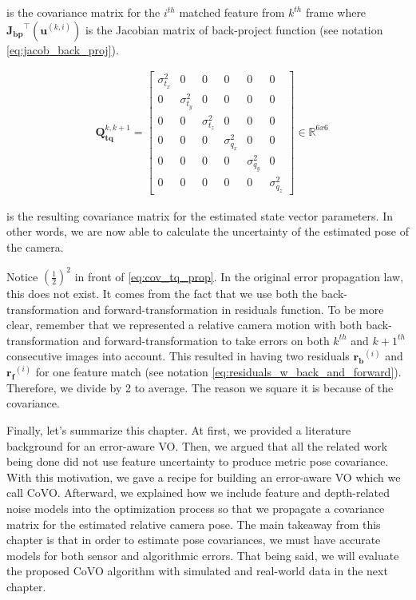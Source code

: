 \documentclass[12pt]{report}
\numberwithin{figure}{section}
\newcommand{\R}{\mathbb{R}}
\begin{document}
is the covariance matrix for the $i^{th}$ matched feature from $k^{th}$ frame 
where $\mathbf{J_{bp}}^\top(\mathbf{u}^{(k,i)})$ is the Jacobian matrix 
of 
back-project function (see notation \eqref{eq:jacob_back_proj}).

\begin{equation} \begin{aligned} & \mathbf{Q}_{\mathbf{tq}}^{k,k+1}  =
\begin{bmatrix} \sigma_{t_x}^2 & 0 & 0 & 0 & 0 & 0 \\ 0 & \sigma_{t_y}^2 & 0 &
0 & 0 & 0 \\ 0 & 0 & \sigma_{t_z}^2 & 0 & 0 & 0 \\ 0 & 0 & 0 & \sigma_{q_x}^2 &
0 & 0 \\ 0 & 0 & 0 & 0 & \sigma_{q_y}^2 & 0 \\ 0 & 0 & 0 & 0 & 0 &
\sigma_{q_z}^2 \end{bmatrix} \in \R^{6x6} \end{aligned} \end{equation}

is the resulting covariance matrix for the estimated state vector parameters.
In other words, we are now able to calculate the uncertainty of the estimated
pose of the camera.

Notice $(\frac{1}{2})^2$ in front of \eqref{eq:cov_tq_prop}.  In the original
error propagation law, this does not exist.  It comes from the fact that we use
both the back-transformation and forward-transformation in residuals 
function.  To be
more clear, remember that we represented a relative camera motion with both
back-transformation and forward-transformation to take errors on both $k^{th}$ 
and $k+1^{th}$
consecutive images into account. This resulted in having two residuals
$\mathbf{r_b}^{(i)}$ and $\mathbf{r_f}^{(i)}$ for one feature match (see
notation \eqref{eq:residuals_w_back_and_forward}).  Therefore, we divide by 2 
to
average. The reason we square it is because of the covariance.

Finally, let's summarize this chapter. At first, we provided a literature
background for an error-aware VO. Then, we argued that all the related work being
done did not use feature uncertainty to produce metric pose covariance. With
this motivation, we gave a recipe for building an error-aware VO which we call
CoVO. Afterward, we explained how we include feature and depth-related noise 
models
into the optimization process so that we propagate a covariance matrix for the
estimated relative camera pose. 
The main takeaway from this chapter is that in order to estimate 
pose covariances, we must have accurate models for both sensor and 
algorithmic errors. 
That being said, we will evaluate the
proposed CoVO algorithm with simulated and real-world data in the next chapter. 
\end{document}
